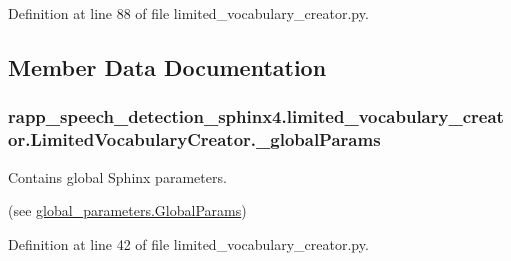Definition at line 88 of file limited\-\_\-vocabulary\-\_\-creator.\-py.



\subsection{Member Data Documentation}
\hypertarget{classrapp__speech__detection__sphinx4_1_1limited__vocabulary__creator_1_1LimitedVocabularyCreator_aed3371150a1a9bf3a2c08b2d723b9b6d}{
\subsubsection[{\-\_\-global\-Params}]{\setlength{\rightskip}{0pt plus 5cm}rapp\-\_\-speech\-\_\-detection\-\_\-sphinx4.\-limited\-\_\-vocabulary\-\_\-creator.\-Limited\-Vocabulary\-Creator.\-\_\-global\-Params\hspace{0.3cm}{\ttfamily [private]}}}\label{classrapp__speech__detection__sphinx4_1_1limited__vocabulary__creator_1_1LimitedVocabularyCreator_aed3371150a1a9bf3a2c08b2d723b9b6d}


Contains global Sphinx parameters. 

(see \hyperlink{classrapp__speech__detection__sphinx4_1_1global__parameters_1_1GlobalParams}{global\-\_\-parameters.\-Global\-Params}) 

Definition at line 42 of file limited\-\_\-vocabulary\-\_\-creator.\-py.

